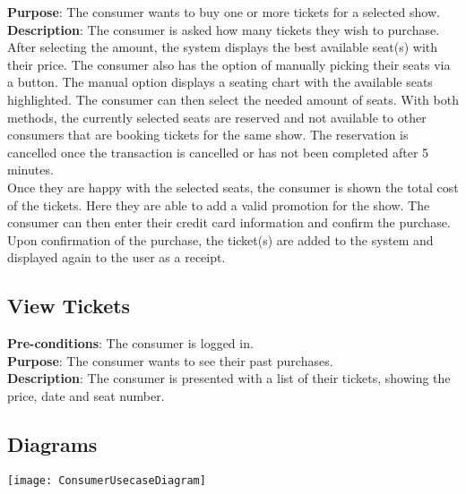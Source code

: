 \textbf{Purpose}: The consumer wants to buy one or more tickets for
a selected show.\\

\textbf{Description}: The consumer is asked how many tickets they
wish to purchase. After selecting the amount, the system displays
the best available seat(s) with their price. The consumer also has
the option of manually picking their seats via a button. The manual
option displays a seating chart with the available seats
highlighted. The consumer can then select the needed amount of
seats. With both methods, the currently selected seats are reserved
and not available to other consumers that are booking tickets for
the same show. The reservation is cancelled once the transaction
is cancelled or has not been completed after 5 minutes.\\

Once they are happy with the selected seats, the consumer is
shown the total cost of the tickets. Here they are able to add a
valid promotion for the show. The consumer can then enter their
credit card information and confirm the purchase.\\

Upon confirmation of the purchase, the ticket(s) are added to the
system and displayed again to the user as a receipt.

\subsection{View Tickets}
\textbf{Pre-conditions}: The consumer is logged in.\\

\textbf{Purpose}: The consumer wants to see their past purchases.\\

\textbf{Description}: The consumer is presented with a list of
their tickets, showing the price, date and seat number.

\subsection{Diagrams}

\texttt{[image: ConsumerUsecaseDiagram]}

